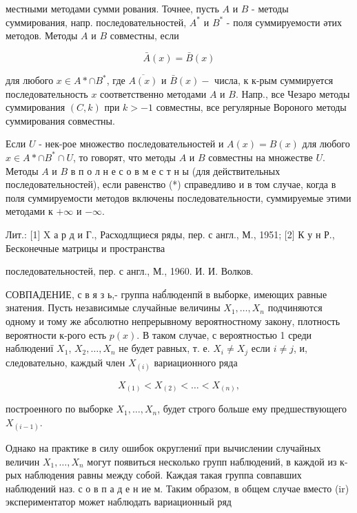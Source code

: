 \documentclass[10pt]{article}
\begin{document}
местными методами сумми рования. Точнее, пусть $A$ и $B$ - методы суммирования, напр. последовательностей, $A^{*}$ и $B^{*}$ - поля суммируемости әтих методов. Методы $A$ и $B$ совместны, если



\[

\bar{A}(x)=\bar{B}(x)

\]



для любого $x \in A * \cap B^{*}$, где $\overline{A(x)}$ и $\bar{B}(x)-$ числа, к к-рым суммируется последовательность $x$ соответственно методами $A$ и $B$. Напр., все Чезаро методы суммирования $(C, k)$ при $k>-1$ совместны, все регулярные Вороного методы суммирования совместны.



Если $U$ - нек-рое множество последовательностей и $A(x)=B(x)$ для любого $x \in A * \cap B^{*} \cap U$, то говорят, что методы $A$ и $B$ совместны на множестве $U$. Методы $A$ и $B$ в п о л н е с о в м е с т н ы (для действительных последовательностей), если равенство (*) справедливо и в том случае, когда в поля суммируемости методов включены последовательности, суммируемые этими методами к $+\infty$ и $-\infty$.



Лит.: [1] X а р д и Г., Расходлщиеся ряды, пер. с англ., М., 1951; [2] К у н Р., Бесконечные матрицы и пространства

последовательностей, пер. с англ., М., 1960. И. И. Волков.



СОВПАДЕНИЕ, с в я з ь,- группа наб́люденпй в выборке, имеющих равные знатения. Пусть независимые случайные величины $X_{1}, \ldots, X_{n}$ подчиняются одному и тому же абсолютно непрерывному вероятностному закону, плотность вероятности к-рого есть $p(x)$. В таком случае, с вероятностью 1 среди наблюдениї $X_{1}$, $X_{2}, \ldots, X_{n}$ не будет равных, т. е. $X_{i} \neq X_{j}$ если $i \neq j$, и, следовательно, каждый член $X_{(i)}$ вариационного ряда



\[

X_{(1)}<X_{(2)}<\ldots<X_{(n)},

\]



построенного по выборке $X_{1}, \ldots, X_{n}$, будет строго больше ему предшествующего $X_{(i-1)}$.



Однако на практике в силу ошибок округлениї при вычислении случайных величин $X_{1}, \ldots, X_{n}$ могут появиться несколько групп наблюдений, в каждой из к-рых наблюдения равны между собой. Каждая такая группа совпавших наблюдений наз. с о в п а д е н ие м. Таким образом, в общем случае вместо (ir) экспериментатор может наблюдать вариационный ряд
\end{document}
